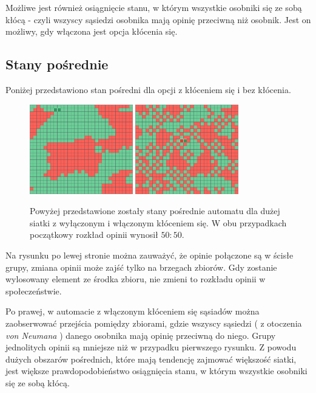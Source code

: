 \documentclass[12pt]{article}
\begin{document}
Możliwe jest również osiągnięcie stanu, w którym wszystkie osobniki się ze sobą kłócą - czyli wszyscy sąsiedzi osobnika mają opinię przeciwną niż osobnik. Jest on możliwy, gdy włączona jest opcja kłócenia się.

\subsection{Stany pośrednie}

Poniżej przedstawiono stan pośredni dla opcji z kłóceniem się i bez kłócenia.

\begin{figure}[H]
\centering
\includegraphics[width=0.4\textwidth]{sym_bez.png} \quad
\includegraphics[width=0.4\textwidth]{sym_klocenie.png}
\caption{Powyżej przedstawione zostały stany pośrednie automatu dla dużej siatki z wyłączonym i włączonym kłóceniem się. W obu przypadkach początkowy rozkład opinii wynosił $50:50$. }
\end{figure}

Na rysunku po lewej stronie można zauważyć, że opinie połączone są w ścisłe grupy, zmiana opinii może zajść tylko na brzegach zbiorów. Gdy zostanie wylosowany element ze środka zbioru, nie zmieni to rozkładu opinii w społeczeństwie.

Po prawej, w automacie z włączonym kłóceniem się sąsiadów można zaobserwować przejścia pomiędzy zbiorami, gdzie wszyscy sąsiedzi ( z otoczenia \textit{von Neumana} ) danego osobnika mają opinię przeciwną do niego. Grupy jednolitych opinii są mniejsze niż w przypadku pierwszego rysunku. Z powodu dużych obszarów pośrednich, które mają tendencję zajmować większość siatki, jest większe prawdopodobieństwo osiągnięcia stanu, w którym wszystkie osobniki się ze sobą kłócą.
\end{document}
